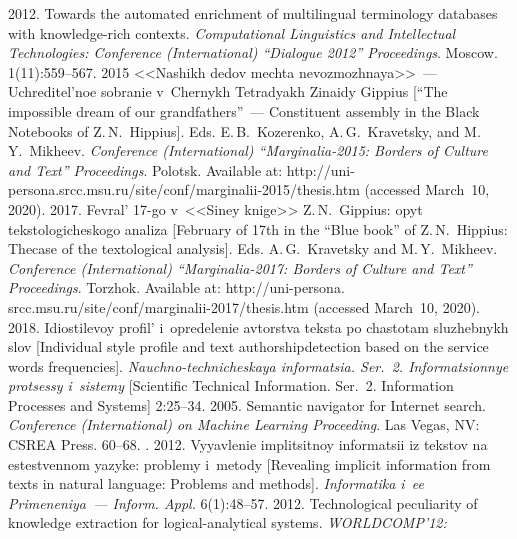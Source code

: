 \begin{multicols}{2}
{{\begin{thebibliography}{99}
 2012. Towards the automated enrichment of multilingual terminology 
databases with knowledge-rich contexts. \textit{Computational Linguistics and Intellectual Technologies: 
Conference (International) ``Dialogue 2012'' Proceedings}. Moscow. 1(11):559--567. 
 2015 <<Nashikh dedov mechta nevozmozhnaya>>~--- 
Uchreditel'noe sobranie v~Chernykh Tetradyakh Zinaidy Gippius [``The impossible dream of 
our grandfathers''~--- Constituent assembly in the Black Notebooks of 
Z.\,N.~Hippius]. Eds. 
E.\,B.~Ko\-ze\-ren\-ko, A.\,G.~Kra\-vet\-sky, and M.\,Y.~Mikheev. \textit{Conference (International) 
``Marginalia-2015: Borders of Culture and Text'' Proceedings}. Polotsk. Available at: 
{\sf http://uni-persona.srcc.msu.ru/site/conf/marginalii-2015/thesis.htm}
(accessed March~10, 2020).
 2017. Fevral' 17-go v~<<Siney kni\-ge>> Z.\,N.~Gippius: opyt 
tekstologicheskogo ana\-li\-za [February of 17th in the ``Blue book''
 of Z.\,N.~Hippius: The\linebreak case 
of the textological analysis]. Eds. A.\,G.~Kra\-vet\-sky and M.\,Y.~Mi\-khe\-ev. \textit{Conference 
(International) ``Marginalia-2017: Borders of Culture and Text'' Proceedings}.
 Torzhok. Available at: 
 {\sf  http://uni-persona. srcc.msu.ru/site/conf/marginalii-2017/thesis.htm}
 (accessed March~10, 2020).
 2018. Idiostilevoy profil'
 i~opredelenie avtorstva 
teksta po chastotam sluzhebnykh slov 
[Individual style profile and text authorship\linebreak detection 
based on the service words frequencies]. \textit{Nauchno-technicheskaya informatsia. Ser.~2. 
Informatsionnye pro\-tses\-sy i~sistemy} [Scientific Technical Information. Ser.~2. Information 
Processes and Systems] 2:25--34.
 2005. Semantic navigator for 
Internet search. \textit{Conference (International) on Machine Learning 
Proceeding}. Las Vegas, NV: CSREA Press. 60--68.
. 2012. Vyyavlenie implitsitnoy informatsii iz 
tekstov na estestvennom yazyke: problemy i~metody [Revealing implicit information from texts 
in natural language: Problems and methods]. \textit{Informatika i~ee Primeneniya~--- Inform. 
Appl.} 6(1):48--57. 
 2012. Technological 
peculiarity of knowledge extraction for logical-analytical systems. \textit{WORLDCOMP'12: 
}
\end{thebibliography}}}
\end{multicols}
